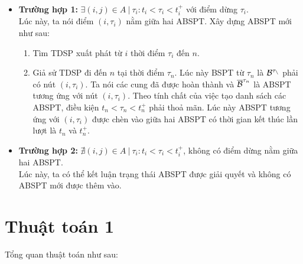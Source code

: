 \documentclass[../main.tex]{subfiles}
\begin{document}
\begin{itemize}
\tightlist
\item
  \textbf{Trường hợp 1:}
  \(\exists (i, j) \in A\ |\ \tau_i:t_i < \tau_i < t_i^+\) với điểm dừng
  \(\tau_i\). \\ 
  Lúc này, ta nói điểm \((i, \tau_i)\) nằm giữa hai ABSPT.
  Xây dựng ABSPT mới như sau:

  \begin{enumerate}
  \def\labelenumi{\arabic{enumi}.}
  \tightlist
  \item
    Tìm TDSP xuất phát từ \(i\) thời điểm \(\tau_i\) đến \(n\).
  \item
    Giả sử TDSP đi đến \(n\) tại thời điểm \(\tau_n\). Lúc này BSPT từ
    \(\tau_n\) là \(\cal B ^{\tau_n}\) phải có nút \((i, \tau_i)\). Ta
    nói các cung đã được hoàn thành và \(\overline {\cal B} ^{\tau_n}\)
    là ABSPT tương ứng với nút \((i, \tau_i)\). Theo tính chất của việc
    tạo danh sách các ABSPT, điều kiện \(t_n < \tau_n < t_n^+\) phải
    thoả mãn. Lúc này ABSPT tương ứng với \((i, \tau_i)\) được chèn vào
    giữa hai ABSPT có thời gian kết thúc lần lượt là \(t_n\) và
    \(t_n^+\).
  \end{enumerate}
\item
  \textbf{Trường hợp 2:}
  \(\nexists (i, j)\in A\ |\ \tau_i: t_i < \tau_i < t_i^+\), không có
  điểm dừng nằm giữa hai ABSPT. \\
  Lúc này, ta có thể kết luận trạng thái
  ABSPT được giải quyết và không có ABSPT mới được thêm vào. 
\end{itemize}

\section{Thuật toán 1}\label{thuux1eadt-touxe1n-1}

Tổng quan thuật toán như sau:
\end{document}
